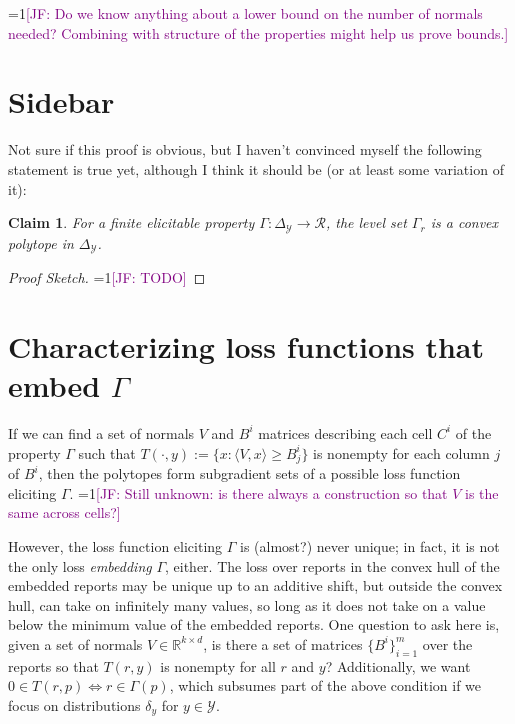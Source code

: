\documentclass[12pt]{article}
\newcommand{\Comments}{1}
\newcommand{\mynote}[2]{\ifnum\Comments=1\textcolor{#1}{#2}\fi}
\newcommand{\jessie}[1]{\mynote{purple}{[JF: #1]}}
\newcommand{\reals}{\mathbb{R}}
\newcommand{\R}{\mathcal{R}}
\newcommand{\Y}{\mathcal{Y}}
\newcommand{\inprod}[2]{\langle #1, #2 \rangle}
\newcommand{\simplex}{\Delta_\Y}
\newtheorem{claim}{Claim}
\begin{document}
\jessie{Do we know anything about a lower bound on the number of normals needed?  Combining with structure of the properties might help us prove bounds.}

\section{Sidebar}
Not sure if this proof is obvious, but I haven't convinced myself the following statement is true yet, although I think it should be (or at least some variation of it):
\begin{claim}
For a finite elicitable property $\Gamma: \simplex\to\R$, the level set $\Gamma_r$ is a convex polytope in $\simplex$.
\end{claim}
\begin{proof}[Proof Sketch]
\jessie{TODO}
\end{proof}

\section{Characterizing loss functions that embed $\Gamma$}
If we can find a set of normals $V$ and $B^i$ matrices describing each cell $C^i$ of the property $\Gamma$ such that $T(\cdot, y) := \{x : \inprod{V}{x} \geq B^i_{j} \}$ is nonempty for each column $j$ of $B^i$, then the polytopes form subgradient sets of a possible loss function eliciting $\Gamma$.
\jessie{Still unknown: is there always a construction so that $V$ is the same across cells?}

However, the loss function eliciting $\Gamma$ is (almost?) never unique; in fact, it is not the only loss \emph{embedding} $\Gamma$, either.
The loss over reports in the convex hull of the embedded reports may be unique up to an additive shift, but outside the convex hull, can take on infinitely many values, so long as it does not take on a value below the minimum value of the embedded reports.
One question to ask here is, given a set of normals $V \in \reals^{k \times d}$, is there a set of matrices $\{B^i\}_{i=1}^{m}$ over the reports so that $T(r,y)$ is nonempty for all $r$ and $y$?
Additionally, we want $0 \in T(r,p) \iff r \in \Gamma(p)$, which subsumes part of the above condition if we focus on distributions $\delta_y$ for $y \in \Y$.
\end{document}
